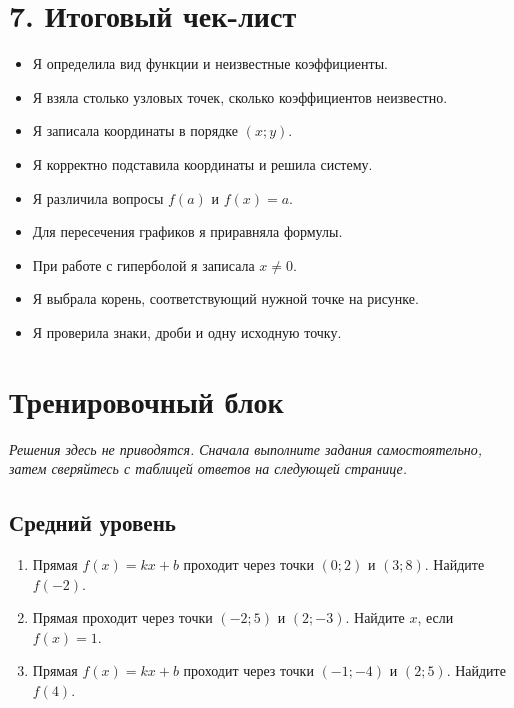 \documentclass[a4paper,12pt]{article}
\begin{document}
\section*{7. Итоговый чек-лист}
\begin{keybox}
\begin{itemize}
\item Я определила вид функции и неизвестные коэффициенты.
\item Я взяла столько узловых точек, сколько коэффициентов неизвестно.
\item Я записала координаты в порядке $(x;y)$.
\item Я корректно подставила координаты и решила систему.
\item Я различила вопросы $f(a)$ и $f(x)=a$.
\item Для пересечения графиков я приравняла формулы.
\item При работе с гиперболой я записала $x\ne0$.
\item Я выбрала корень, соответствующий нужной точке на рисунке.
\item Я проверила знаки, дроби и одну исходную точку.
\end{itemize}
\end{keybox}

\clearpage
\section*{Тренировочный блок}
\textit{Решения здесь не приводятся. Сначала выполните задания самостоятельно, затем сверяйтесь с таблицей ответов на следующей странице.}

\subsection*{Средний уровень}
\begin{enumerate}
\item Прямая $f(x)=kx+b$ проходит через точки $(0;2)$ и $(3;8)$. Найдите $f(-2)$.
\item Прямая проходит через точки $(-2;5)$ и $(2;-3)$. Найдите $x$, если $f(x)=1$.
\item Прямая $f(x)=kx+b$ проходит через точки $(-1;-4)$ и $(2;5)$. Найдите $f(4)$.
\end{enumerate}
\end{document}
